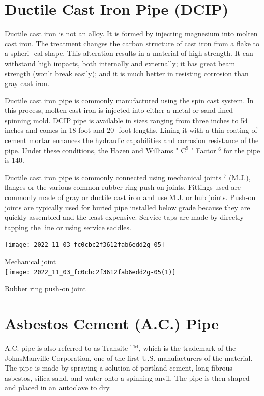 \documentclass[10pt]{article}
\begin{document}
\section{Ductile Cast Iron Pipe (DCIP)}
Ductile cast iron is not an alloy. It is formed by injecting magnesium into molten cast iron. The treatment changes the carbon structure of cast iron from a flake to a spheri- cal shape. This alteration results in a material of high strength. It can withstand high impacts, both internally and externally; it has great beam strength (won't break easily); and it is much better in resisting corrosion than gray cast iron.

Ductile cast iron pipe is commonly manufactured using the spin cast system. In this process, molten cast iron is injected into either a metal or sand-lined spinning mold. DCIP pipe is available in sizes ranging from three inches to 54 inches and comes in 18-foot and 20 -foot lengths. Lining it with a thin coating of cement mortar enhances the hydraulic capabilities and corrosion resistance of the pipe. Under these conditions, the Hazen and Williams " $\mathrm{C}^{9}$ " Factor $^{6}$ for the pipe is 140.

Ductile cast iron pipe is commonly connected using mechanical joints ${ }^{7}$ (M.J.), flanges or the various common rubber ring push-on joints. Fittings used are commonly made of gray or ductile cast iron and use M.J. or hub joints. Push-on joints are typically used for buried pipe installed below grade because they are quickly assembled and the least expensive. Service taps are made by directly tapping the line or using service saddles.

\texttt{[image: 2022\_11\_03\_fc0cbc2f3612fab6edd2g-05]}

Mechanical joint\\

\texttt{[image: 2022\_11\_03\_fc0cbc2f3612fab6edd2g-05(1)]}

Rubber ring push-on joint

\section{Asbestos Cement (A.C.) Pipe}
A.C. pipe is also referred to as Transite ${ }^{\mathrm{TM}}$, which is the trademark of the JohnsManville Corporation, one of the first U.S. manufacturers of the material. The pipe is made by spraying a solution of portland cement, long fibrous asbestos, silica sand, and water onto a spinning anvil. The pipe is then shaped and placed in an autoclave to dry.
\end{document}

